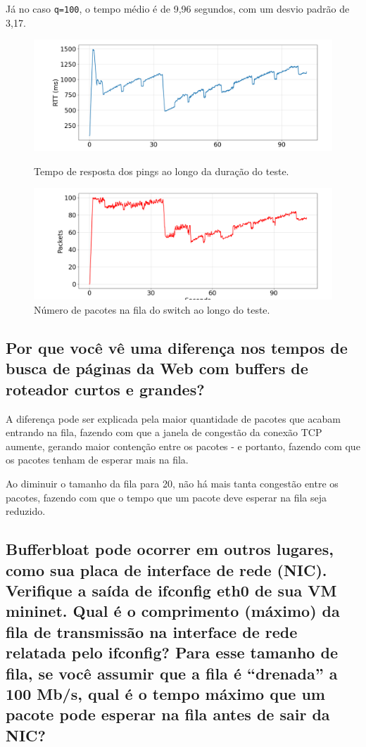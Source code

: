 \documentclass[a4paper,12pt]{article}
\newcommand{\code}[1]{\texttt{#1}}
\begin{document}
\newpage

Já no caso \code{q=100}, o tempo médio é de 9,96 segundos, com um desvio padrão de 3,17.

\begin{figure}[h!]
  \centering
  \includegraphics[width=0.5\columnwidth]{./bufferbloat/reno-rtt-q100.png}
  \caption{Tempo de resposta dos pings ao longo da duração do teste.}
  \includegraphics[width=0.5\columnwidth]{./bufferbloat/reno-buffer-q100.png}
  \caption{Número de pacotes na fila do switch ao longo do teste.}
\end{figure}

\subsection{Por que você vê uma diferença nos tempos de busca de páginas da Web com buffers de roteador curtos e grandes?}

A diferença pode ser explicada pela maior quantidade de pacotes que acabam entrando na fila, fazendo com que a janela de congestão da conexão TCP aumente, gerando maior contenção entre os pacotes - e portanto, fazendo com que os pacotes tenham de esperar mais na fila.

Ao diminuir o tamanho da fila para 20, não há mais tanta congestão entre os pacotes, fazendo com que o tempo que um pacote deve esperar na fila seja reduzido.

\subsection{Bufferbloat pode ocorrer em outros lugares, como sua placa de interface de rede (NIC). Verifique a saída de ifconfig eth0 de sua VM mininet. Qual é o comprimento (máximo) da fila de transmissão na interface de rede relatada pelo ifconfig? Para esse tamanho de fila, se você assumir que a fila é “drenada” a 100 Mb/s, qual é o tempo máximo que um pacote pode esperar na fila antes de sair da NIC?
}
\end{document}
